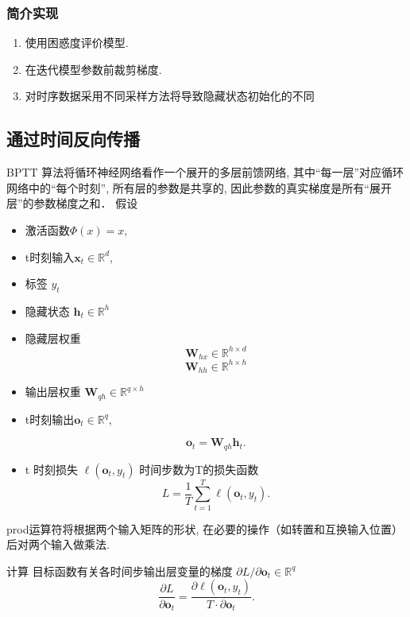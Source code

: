 
\subsubsection{简介实现}

\begin{enumerate}
    \item  使用困惑度评价模型. 
    \item  在迭代模型参数前裁剪梯度. 
    \item  对时序数据采用不同采样方法将导致隐藏状态初始化的不同
\end{enumerate}

\subsection{通过时间反向传播}
BPTT 算法将循环神经网络看作一个展开的多层前馈网络, 其中“每一层”对应循环网络中的“每个时刻”, 所有层的参数是共享的, 因此参数的真实梯度是所有“展开层”的参数梯度之和．
假设
\begin{itemize}
\item 激活函数$\Phi(x)=x$, 
\item t时刻输入$\mathbf{x}_t \in \mathbb{R}^d$, 
\item 标签 $y_t$
\item 隐藏状态 $\mathbf{h}_t \in \mathbb{R}^h$
\item 隐藏层权重 
$$\mathbf{W}_{hx} \in \mathbb{R}^{h \times d}$$
$$\mathbf{W}_{hh} \in \mathbb{R}^{h \times h}$$
\item 输出层权重
$\mathbf{W}_{qh} \in \mathbb{R}^{q \times h}$
\item
t时刻输出$\mathbf{o}_t \in \mathbb{R}^q$, 

$$\mathbf{o}_t = \mathbf{W}_{qh} \mathbf{h}_{t}.$$
\item 
t 时刻损失 $\ell(\mathbf{o}_t,  y_t)$
时间步数为T的损失函数$$L = \frac{1}{T} \sum_{t=1}^T \ell (\mathbf{o}_t,  y_t).$$
\end{itemize}
  
prod运算符将根据两个输⼊矩阵的形状, 在必要的操作（如转置和互换输⼊位置）后对两个输⼊做乘法. 


计算
目标函数有关各时间步输出层变量的梯度 $\partial L/\partial \mathbf{o}_t \in \mathbb{R}^q$
$$\frac{\partial L}{\partial \mathbf{o}_t} =  \frac{\partial \ell (\mathbf{o}_t,  y_t)}{T \cdot \partial \mathbf{o}_t}.$$

